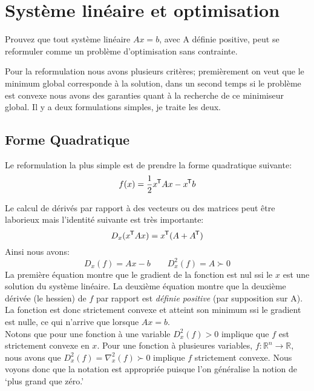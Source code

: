 \clearpage
\section{Syst\`eme lin\'eaire et optimisation}
Prouvez que tout système linéaire $Ax = b$, avec A définie positive, peut se
reformuler comme un problème d’optimisation sans contrainte. 

Pour la reformulation nous avons plusieurs crit\`eres; premi\`erement on veut
que le minimum global corresponde \`a la solution, dans un second temps
si le probl\`eme est convexe nous avons des garanties quant \`a la recherche
de ce minimiseur global. Il y a deux formulations simples, je traite les
deux.
\subsection{Forme Quadratique}
Le reformulation la plus simple est de prendre la forme quadratique suivante:\\
\begin{equation}
    f(x) = \frac{1}{2}x^{\mkern-1.5mu\mathsf{T}} A x - x^{\mkern-1.5mu\mathsf{T}} b
\end{equation}

Le calcul de d\'eriv\'es par rapport \`a des vecteurs ou des matrices
peut \^etre laborieux mais l'identit\'e suivante est tr\`es importante:
\begin{equation}
    D_x (x^{\mkern-1.5mu\mathsf{T}} A x) = x^{\mkern-1.5mu\mathsf{T}} (A + A^{\mkern-1.5mu\mathsf{T}})
\end{equation}
Ainsi nous avons:
\begin{equation}
    D_x(f) = Ax - b \qquad D_x^2(f) = A \succ 0
\end{equation}
La premi\`ere \'equation montre que le gradient de la fonction est nul ssi le
$x$ est une solution du syst\`eme lin\'eaire. La deuxi\`eme \'equation montre
que la deuxi\`eme d\'eriv\'ee (le hessien) de $f$ par rapport est
\emph{d\'efinie positive} (par supposition sur A). La fonction est donc
strictement convexe et atteint son minimum ssi le gradient est nulle, ce qui
n'arrive que lorsque $Ax = b$. \\

Notons que pour une fonction \`a une variable $D^2_x(f) > 0$ implique
que $f$ est strictement convexe en $x$. Pour une fonction \`a plusieures
variables, $f : \mathbb R^n \rightarrow \mathbb R$, nous avons que $D^2_x(f) =
\nabla^2_x (f) \succ 0$ implique $f$ strictement convexe. Nous voyons donc
que la notation est appropri\'ee puisque l'on g\'en\'eralise la notion de
`plus grand que z\'ero.'

